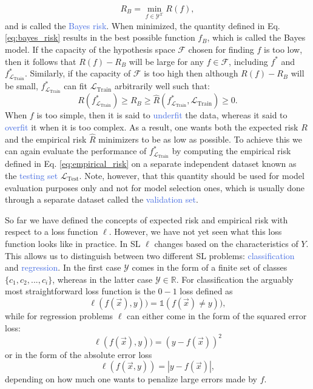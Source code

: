 \begin{equation}
	R_B = \underset{f\in\mathcal{Y}^{\mathcal{X}}}{\min} R(f),
	\label{eq:bayes_risk}
\end{equation}
and is called the \textcolor{RoyalBlue}{Bayes risk}. When minimized, the quantity defined in Eq. \ref{eq:bayes_risk} results in the best possible function $f_B$, which is called the Bayes model. If the capacity of the hypothesis space $\mathcal{F}$ chosen for finding $f$ is too low, then it follows that $R(f)-R_B$ will be large for any $f\in\mathcal{F}$, including $f^{*}$ and $f^{*}_{\mathcal{L}_{\text{Train}}}$. Similarly, if the capacity of $\mathcal{F}$ is too high then although $R(f)-R_B$ will be small, $f^{*}_{\mathcal{L}_\text{Train}}$ can fit 
$\mathcal{L}_{\text{Train}}$ arbitrarily well such that:
\begin{equation}
	R(f^{*}_{\mathcal{L}_{\text{Train}}}) \geq R_B \geq \hat{R}(f^{*}_{\mathcal{L}_{\text{Train}}},\mathcal{L}_{\text{Train}}) \geq 0.
\end{equation}
When $f$ is too simple, then it is said to \textcolor{RoyalBlue}{underfit} the data, whereas it said to \textcolor{RoyalBlue}{overfit} it when it is too complex. As a result, one wants both the expected risk $R$ and the empirical risk $\hat{R}$ minimizers to be as low as possible. To achieve this we can again evaluate the performance of $f^{*}_{\mathcal{L}_{\text{Train}}}$ by computing the empirical risk defined in Eq. \ref{eq:empirical_risk} on a separate independent dataset known as the \textcolor{RoyalBlue}{testing set} $\mathcal{L}_{\text{Test}}$. Note, however, that this quantity should be used for model evaluation purposes only and not for model selection ones, which is usually done through a separate dataset called the \textcolor{RoyalBlue}{validation set}. 

So far we have defined the concepts of expected risk and empirical risk with respect to a loss function $\ell$. However, we have not yet seen what this loss function looks like in practice. In SL $\ell$ changes based on the characteristics of $Y$. This allows us to distinguish between two different SL problems: \textcolor{RoyalBlue}{classification} and \textcolor{RoyalBlue}{regression}. In the first case $\mathcal{Y}$ comes in the form of a finite set of classes $\{c_1, c_2,...,c_i\}$, whereas in the latter case $\mathcal{Y}\in\mathds{R}$. For classification the arguably most straightforward loss function is the $0-1$ loss defined as 
\begin{equation}
	\ell(f(\vec{x}),y)) = \mathbb{1}(f(\vec{x})\neq y)),
\end{equation}
while for regression problems $\ell$ can either come in the form of the squared error loss:
\begin{equation}
	\ell(f(\vec{x}),y))=(y-f(\vec{x}))^2
\end{equation}
or in the form of the absolute error loss
\begin{equation}
	\ell(f(\vec{x},y))=|y-f(\vec{x})|,
\end{equation}
depending on how much one wants to penalize large errors made by $f$.

